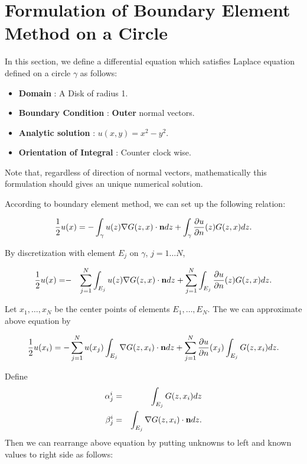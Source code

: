\section{Formulation of Boundary Element Method on a Circle}
In this section, we define a differential equation which satisfies
Laplace equation defined on a circle $\gamma$ as follows:
\begin{itemize}
\item {\bf Domain} : A Disk of radius 1.
\item {\bf Boundary Condition} : {\bf Outer} normal vectors.
\item {\bf Analytic solution} : $u(x,y) = x^2 - y^2$.
\item {\bf Orientation of Integral} : Counter clock wise.
\end{itemize}

Note that, regardless of direction of normal vectors,
mathematically this formulation should gives an unique numerical
solution.

According to boundary element method, we can set up the following
relation:

\begin{eqnarray}
\frac{1}{2}u(x) = -\int_{\gamma} u(z) \nabla G(z,x)\cdot {\bf n}
dz + \int_{\gamma} \frac{\partial u}{\partial n}(z) G(z, x) dz.
\end{eqnarray}

By discretization with element $E_j$ on $\gamma$, $j=1 \dots N$,

\begin{eqnarray}
\frac{1}{2}u(x) =  &-&\sum_{j=1}^{N}\int_{E_j} u(z) \nabla
G(z,x)\cdot {\bf n} dz + \sum_{j=1}^{N}\int_{E_j} \frac{\partial
u}{\partial n}(z) G(z, x) dz.
\end{eqnarray}


Let ${x_1, \dots, x_N}$ be the center points of elements ${E_1,
\dots, E_N}$. The we can approximate above equation by

\begin{eqnarray}
\frac{1}{2}u(x_i) = - \sum_{j=1}^{N}u(x_j)\int_{E_j} \nabla
G(z,x_i)\cdot {\bf n} dz + \sum_{j=1}^{N}\frac{\partial
u}{\partial n}(x_j)\int_{E_j} G(z, x_i) dz.
\end{eqnarray}


Define
\begin{eqnarray}
\alpha_j^i &=& \int_{E_j}G(z,x_i)dz\\
\beta_j^i &=& \int_{E_j}\nabla G(z,x_i)\cdot {\bf n} dz.
\end{eqnarray}
Then we can rearrange above equation by putting unknowns to left
and known values to right side as follows:

